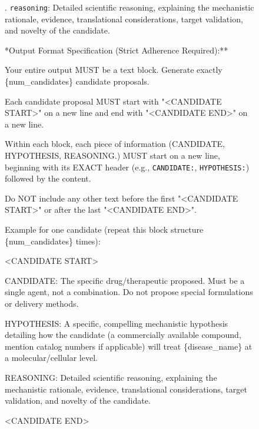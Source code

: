 \documentclass{article}
\newcounter{suppfigure}
\newenvironment{suppfigureenv}{
  \renewcommand{\thefigure}{S\arabic{suppfigure}}%
  \refstepcounter{suppfigure}%
  \begin{figure}[H]
}{
  \end{figure}
}
\begin{document}
\begin{suppfigureenv}
\begin{tcolorbox}
\quad {}.  \texttt{\textasciigrave reasoning\textasciigrave}: Detailed scientific reasoning, explaining the mechanistic rationale, evidence, translational considerations, target validation, and novelty of the candidate.

\quad **Output Format Specification (Strict Adherence Required):**

\quad Your entire output MUST be a text block. Generate exactly \{num\_candidates\} candidate proposals.

\quad Each candidate proposal MUST start with "\textless{}CANDIDATE START\textgreater{}" on a new line and end with "\textless{}CANDIDATE END\textgreater{}" on a new line.

\quad Within each block, each piece of information (CANDIDATE, HYPOTHESIS, REASONING.) MUST start on a new line, beginning with its EXACT header (e.g., \texttt{\textasciigrave CANDIDATE:\textasciigrave}, \texttt{\textasciigrave HYPOTHESIS:\textasciigrave}) followed by the content.

\quad Do NOT include any other text before the first "\textless{}CANDIDATE START\textgreater{}" or after the last "\textless{}CANDIDATE END\textgreater{}".

\quad Example for one candidate (repeat this block structure \{num\_candidates\} times):\par\noindent

\quad \textless{}CANDIDATE START\textgreater{}\par\noindent

\quad CANDIDATE: The specific drug/therapeutic proposed. Must be a single agent, not a combination. Do not propose special formulations or delivery methods.\par\noindent

\quad HYPOTHESIS: A specific, compelling mechanistic hypothesis detailing how the candidate (a commercially available compound, mention catalog numbers if applicable) will treat \{disease\_name\} at a molecular/cellular level.\par\noindent

\quad REASONING: Detailed scientific reasoning, explaining the mechanistic rationale, evidence, translational considerations, target validation, and novelty of the candidate.\par\noindent

\quad \textless{}CANDIDATE END\textgreater{}

\tcbline %


\end{tcolorbox}
\end{suppfigureenv}
\end{document}
